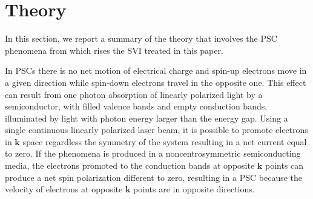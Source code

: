 \documentclass[prb,11pt,tightenlines,twocolumn,aps]{revtex4-1}
\begin{document}
\section{Theory} %
\label{sec:theory}




In this section, we report a summary of the theory that involves the PSC
phenomena from which rises the SVI treated in this paper.
 
{\color{red}
In PSCs there is no net motion of electrical charge and spin-up electrons move
in a given direction while spin-down electrons travel in the opposite one.
This effect can result from one photon absorption of linearly polarized light
by a semiconductor, with filled valence bands and empty conduction bands,
illuminated by light with photon energy larger than the energy gap.
Using a single continuous linearly polarized laser beam, it is possible
to promote electrons in $\mathbf{k}$ space regardless the symmetry of the
system resulting in a net current equal to zero. 
% 
If the phenomena is produced in a noncentrosymmetric semiconducting media, the
electrons promoted to the conduction bands at opposite $\mathbf{k}$ points
can produce a net spin polarization different to zero\cite{alvaradoPRL85},
resulting in a PSC because the velocity of electrons
at opposite $\mathbf{k}$ points are in opposite directions.
}
\end{document}
